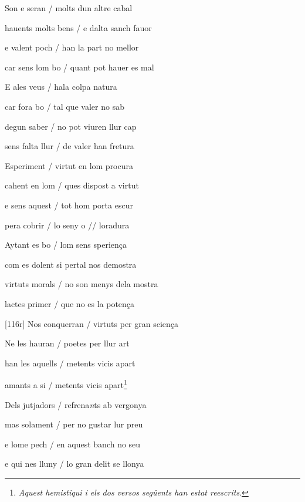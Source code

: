 \documentclass[12pt]{article}
\begin{document}
\begin{estrofa}

 Son e seran / molts dun altre cabal

 hauents molts bens / e dalta sanch fauor

 e valent poch / han la part no mellor

 car sens lom bo / quant pot hauer es mal

 E ales veus / hala colpa natura

 car fora bo / tal que valer no sab

 degun saber / no pot viuren llur cap

 sens falta llur / de valer han fretura

\end{estrofa}



\begin{estrofa}

 Esperiment / virtut en lom procura

 cahent en lom / ques dispost a virtut

 e sens aquest / tot hom porta escur

 pera cobrir / lo seny o // loradura

 Aytant es bo / lom sens sperien\c{c}a

 com es dolent si pertal nos demostra

 virtuts morals / no son menys dela mostra

 lactes primer / que no es la poten\c{c}a

\end{estrofa}



\begin{estrofa}

 [116r] Nos conquerran / virtuts per gran scien\c{c}a

 Ne les hauran / poetes per llur art

 han les aquells / metents vicis apart

 amants a si / metents vicis apart\footnote{\textit{Aquest hemistiqui i els dos
versos seg\"{u}ents han estat reescrits}.}

 Dels jutjadors / refrena\textit{n}ts ab vergonya

 mas solament / per no gustar lur preu

 e lome pech / en aquest banch no seu

 e qui nes lluny / lo gran delit se llonya

\end{estrofa}
\end{document}
